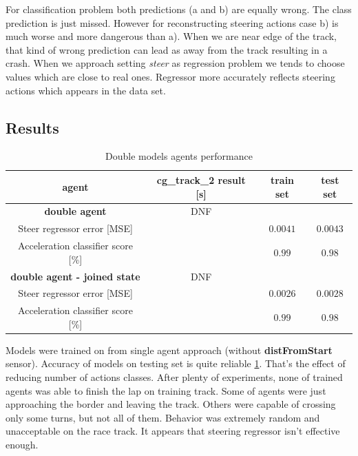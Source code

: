 \documentclass[declaration,shortabstract,english,inz]{iithesis}
\begin{document}
For classification problem both predictions (a and b) are equally wrong.
 The class prediction is just missed.
However for reconstructing steering actions case b) is much worse and more dangerous than a).
When we are near edge of the track, that kind of wrong prediction can lead as away from the track resulting in a crash.
When we approach setting \textit{steer} as regression problem we tends to choose values which are close to real ones.
Regressor more accurately reflects steering actions which appears in the data set.

\subsection{Results}

\begin{table}[h]
    \centering
    \begin{tabular}{ |c|c|c|c|}
          \hline
          agent & cg\_track\_2 result [s] & train set & test set \\
          \hline
          \textbf{double agent} & DNF &   &  \\
          \hline
          Steer regressor error [MSE]&   & $0.0041$ & $0.0043$\\
          \hline
          Acceleration classifier score [\%]&  & $0.99$ & $0.98$ \\
          \hline
          \textbf{double agent - joined state} & DNF &   &  \\
          \hline
          Steer regressor error [MSE]&   & $0.0026$ & $0.0028$\\
          \hline
          Acceleration classifier score [\%]&  & $0.99$ & $0.98$ \\
          \hline
          
        \end{tabular}
        \caption{Double models agents performance}
        \label{tab:double_models_results}

\end{table}


Models were trained on from single agent approach (without \textbf{distFromStart} sensor).
Accuracy of models on testing set is quite reliable \ref{tab:double_models_results}.
That's the effect of reducing number of actions classes.
After plenty of experiments, none of trained agents was able to finish the lap on training track.
Some of agents were just approaching the border and leaving the track.
Others were capable of crossing only some turns, but not all of them.
Behavior was extremely random and unacceptable on the race track.
It appears that steering regressor isn't effective enough.
\end{document}
